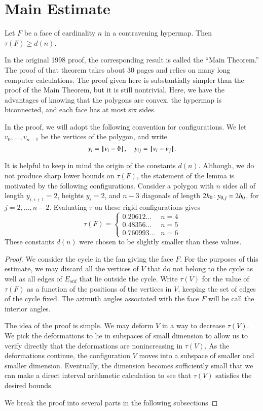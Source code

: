 \section{Main Estimate}

\begin{lemma}  Let $F$ be a face of cardinality $n$ in a contravening hypermap.  Then
        $\tau(F) \ge d(n)$.
\end{lemma}

In the original 1998 proof, the corresponding result
is called the ``Main Theorem.''  The proof of that 
theorem takes about 30 pages and relies on many
long computer calculations.  The proof given here
is substantially simpler than the proof of the
Main Theorem, but
it is still nontrivial.  Here, we have the advantages
of knowing that the polygons are convex, the hypermap
is biconnected, and each face has at most six sides.

In the proof, we will adopt the following convention for
configurations.  We let $v_0,\ldots,v_{n-1}$ be the vertices
of the polygon, and write
$$
y_i = \norm{v_i}{\orgn},\quad y_{ij} = \norm{v_i}{ v_j}.
$$

It is helpful to keep in mind the origin of the constants $d(n)$.
Although, we do not produce sharp lower bounds on $\tau(F)$, the
statement of the lemma is motivated by the following configurations.
Consider a polygon with $n$ sides all of length $y_{i,i+1}=2$, heights
$y_i=2$, and $n-3$ diagonals of length $2{h_0}$: $y_{0,j}=2{h_0}$, for
$j=2,\ldots,n-2$.  Evaluating $\tau$ on these rigid configurations gives
$$
\tau(F) = \begin{cases}
0.20612\ldots & n=4\\
0.48356\ldots & n=5\\
0.760993\ldots &n=6
\end{cases}
$$
These constants $d(n)$ were chosen to be slightly smaller than these values.


\begin{proof}  We consider the cycle in the fan
giving the face $F$.  For the purposes of this
estimate, we may discard all the vertices of $V$
that do not belong to the cycle as well as all edges
of $E_{std}$ that lie outside the cycle.
Write $\tau(V)$ for the value of $\tau(F)$ as a
function of the positions of the vertices in $V$,
keeping the set of edges of the cycle fixed.  The
azimuth angles associated with the face $F$ will be
call the interior angles.  

The idea of the proof is simple.  We may deform $V$ in a way to decrease $\tau(V)$.  We pick the deformations to lie in subspaces of small dimension to allow us to verify directly that the deformations are nonincreasing in $\tau(V)$.  As the deformations continue, the configuration $V$ moves into a subspace of smaller and smaller dimension.  Eventually, the dimension becomes sufficiently small that we can make a direct interval arithmetic calculation to see that $\tau(V)$ satisfies the desired bounds.

We break the proof into several parts in the following
subsections
\end{proof}


